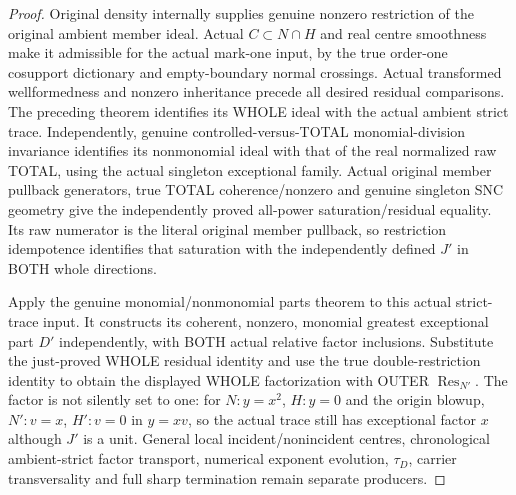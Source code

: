 \begin{proof}
Original density internally supplies genuine nonzero restriction of the
original ambient member ideal. Actual $C\subset N\cap H$ and real centre
smoothness make it admissible for the actual mark-one input, by the true
order-one cosupport dictionary and empty-boundary normal crossings.
Actual transformed wellformedness and nonzero inheritance precede all
desired residual comparisons. The preceding theorem identifies its WHOLE
ideal with the actual ambient strict trace. Independently, genuine
controlled-versus-TOTAL monomial-division invariance identifies its
nonmonomial ideal with that of the real normalized raw TOTAL, using the
actual singleton exceptional family. Actual original member pullback
generators, true TOTAL coherence/nonzero and genuine singleton SNC
geometry give the independently proved all-power saturation/residual
equality. Its raw numerator is the literal original member pullback, so
restriction idempotence identifies that saturation with the independently
defined $J'$ in BOTH whole directions.

Apply the genuine monomial/nonmonomial parts theorem to this actual
strict-trace input. It constructs its coherent, nonzero, monomial
greatest exceptional part $D'$ independently, with BOTH actual relative
factor inclusions. Substitute the just-proved WHOLE residual identity and
use the true double-restriction identity to obtain the displayed WHOLE
factorization with OUTER $\operatorname{Res}_{N'}$. The factor is not
silently set to one: for $N:y=x^2$, $H:y=0$ and the origin blowup,
$N':v=x$, $H':v=0$ in $y=xv$, so the actual trace still has exceptional
factor $x$ although $J'$ is a unit. General local incident/nonincident
centres, chronological ambient-strict factor transport, numerical exponent
evolution, $\tau_D$, carrier transversality and full sharp termination
remain separate producers.
\end{proof}
